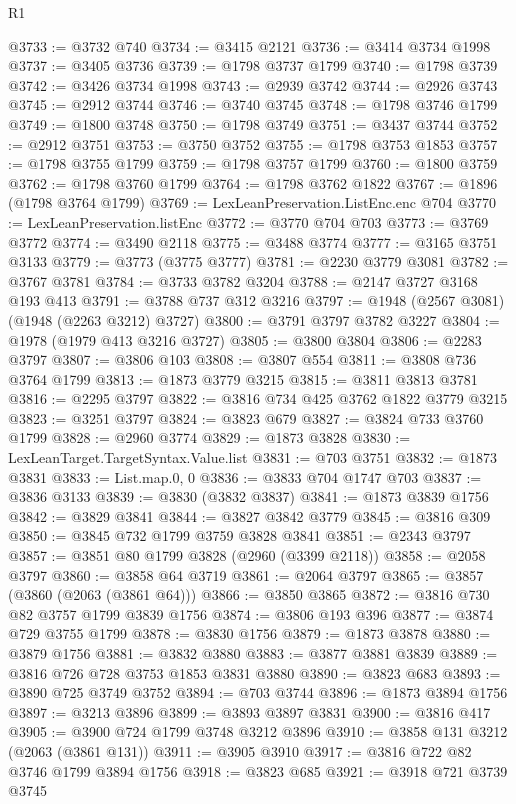 \begin{lexlean}{R1}
\begin{coremodule}
@3733 := @3732 @740
@3734 := @3415 @2121
@3736 := @3414 @3734 @1998
@3737 := @3405 @3736
@3739 := @1798 @3737 @1799
@3740 := @1798 @3739
@3742 := @3426 @3734 @1998
@3743 := @2939 @3742
@3744 := @2926 @3743
@3745 := @2912 @3744
@3746 := @3740 @3745
@3748 := @1798 @3746 @1799
@3749 := @1800 @3748
@3750 := @1798 @3749
@3751 := @3437 @3744
@3752 := @2912 @3751
@3753 := @3750 @3752
@3755 := @1798 @3753 @1853
@3757 := @1798 @3755 @1799
@3759 := @1798 @3757 @1799
@3760 := @1800 @3759
@3762 := @1798 @3760 @1799
@3764 := @1798 @3762 @1822
@3767 := @1896 (@1798 @3764 @1799)
@3769 := LexLeanPreservation.ListEnc.enc @704
@3770 := LexLeanPreservation.listEnc
@3772 := @3770 @704 @703
@3773 := @3769 @3772
@3774 := @3490 @2118
@3775 := @3488 @3774
@3777 := @3165 @3751 @3133
@3779 := @3773 (@3775 @3777)
@3781 := @2230 @3779 @3081
@3782 := @3767 @3781
@3784 := @3733 @3782 @3204
@3788 := @2147 @3727 @3168 @193 @413
@3791 := @3788 @737 @312 @3216
@3797 := @1948 (@2567 @3081) (@1948 (@2263 @3212) @3727)
@3800 := @3791 @3797 @3782 @3227
@3804 := @1978 (@1979 @413 @3216 @3727)
@3805 := @3800 @3804
@3806 := @2283 @3797
@3807 := @3806 @103
@3808 := @3807 @554
@3811 := @3808 @736 @3764 @1799
@3813 := @1873 @3779 @3215
@3815 := @3811 @3813 @3781
@3816 := @2295 @3797
@3822 := @3816 @734 @425 @3762 @1822 @3779 @3215
@3823 := @3251 @3797
@3824 := @3823 @679
@3827 := @3824 @733 @3760 @1799
@3828 := @2960 @3774
@3829 := @1873 @3828
@3830 := LexLeanTarget.TargetSyntax.Value.list
@3831 := @703 @3751
@3832 := @1873 @3831
@3833 := List.map.{0, 0}
@3836 := @3833 @704 @1747 @703
@3837 := @3836 @3133
@3839 := @3830 (@3832 @3837)
@3841 := @1873 @3839 @1756
@3842 := @3829 @3841
@3844 := @3827 @3842 @3779
@3845 := @3816 @309
@3850 := @3845 @732 @1799 @3759 @3828 @3841
@3851 := @2343 @3797
@3857 := @3851 @80 @1799 @3828 (@2960 (@3399 @2118))
@3858 := @2058 @3797
@3860 := @3858 @64 @3719
@3861 := @2064 @3797
@3865 := @3857 (@3860 (@2063 (@3861 @64)))
@3866 := @3850 @3865
@3872 := @3816 @730 @82 @3757 @1799 @3839 @1756
@3874 := @3806 @193 @396
@3877 := @3874 @729 @3755 @1799
@3878 := @3830 @1756
@3879 := @1873 @3878
@3880 := @3879 @1756
@3881 := @3832 @3880
@3883 := @3877 @3881 @3839
@3889 := @3816 @726 @728 @3753 @1853 @3831 @3880
@3890 := @3823 @683
@3893 := @3890 @725 @3749 @3752
@3894 := @703 @3744
@3896 := @1873 @3894 @1756
@3897 := @3213 @3896
@3899 := @3893 @3897 @3831
@3900 := @3816 @417
@3905 := @3900 @724 @1799 @3748 @3212 @3896
@3910 := @3858 @131 @3212 (@2063 (@3861 @131))
@3911 := @3905 @3910
@3917 := @3816 @722 @82 @3746 @1799 @3894 @1756
@3918 := @3823 @685
@3921 := @3918 @721 @3739 @3745

\end{coremodule}
\end{lexlean}
